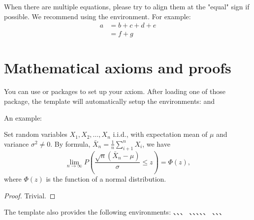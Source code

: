 When there are multiple equations, please try to align them at the "equal" sign if possible. We recommend using the  environment.
For example:
\begin{align}
  a & = b + c + d + e \\
    & = f + g
\end{align}


\section{Mathematical axioms and proofs}

You can use  or  packages to set up your axiom. After loading one of those package, the template will automatically setup the environments:  and 

An example:
\begin{theorem}
  Set random variables $X_1, X_2, \dots, X_n$ i.i.d., with expectation mean of $\mu$ and variance $\sigma^2 \ne 0$. By formula, $\bar{X}_n = \frac{1}{n} \sum_{i+1}^n X_i$, we have
  \begin{equation}
    \lim_{n \to \infty} P \left(\frac{\sqrt{n} \left( \bar{X}_n - \mu \right)}{\sigma} \le z \right) = \Phi(z),
  \end{equation}
  where $\Phi(z)$ is the function of a normal distribution.
\end{theorem}
\begin{proof}
  Trivial.
\end{proof}

The template also provides the following environments: 、、、
、、、、、
、、、 
